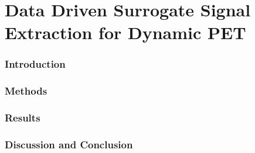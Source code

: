 \chapter{Data Driven Surrogate Signal Extraction for Dynamic PET} \label{sec:data_driven_surrogate_signal_extraction_results}
            
    
        
        
        \subsection{Introduction} \label{sec:extension_of_static_pca_based_data_driven_surrogate_signal_extraction_to_dynamic_pet_using_moving_windows_and_eigenvector_backpropergation_introduction}
        
        \subsection{Methods} \label{sec:extension_of_static_pca_based_data_driven_surrogate_signal_extraction_to_dynamic_pet_using_moving_windows_and_eigenvector_backpropergation_methods}
            
            
        \subsection{Results} \label{sec:extension_of_static_pca_based_data_driven_surrogate_signal_extraction_to_dynamic_pet_using_moving_windows_and_eigenvector_backpropergation_results}
            
            
        \subsection{Discussion and Conclusion} \label{sec:extension_of_static_pca_based_data_driven_surrogate_signal_extraction_to_dynamic_pet_using_moving_windows_and_eigenvector_backpropergation_discussion_and_conclusion}
            
    
        
